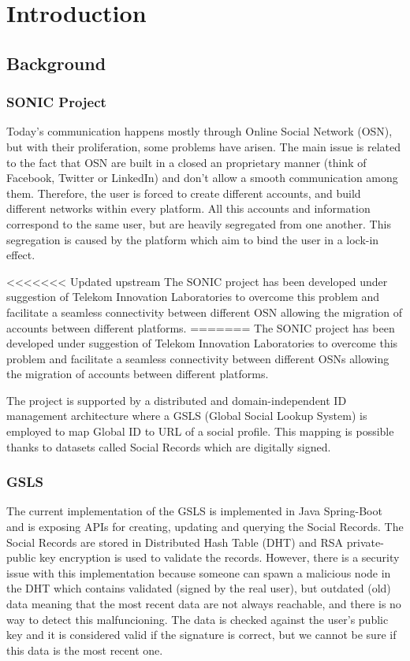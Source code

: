 \chapter{Introduction}
\label{introduction}

\section{Background}

\subsection{SONIC Project}
Today’s communication happens mostly through Online Social Network (OSN), but with their proliferation, some problems have arisen. The main issue is related to the fact that OSN are built in a closed an proprietary manner (think of Facebook, Twitter or LinkedIn) and don’t allow a smooth  communication among them. Therefore, the user is forced to create different accounts, and build different networks within every platform. All this accounts and information correspond to the same user, but are heavily segregated from one another. This segregation is caused by the platform which aim to bind the user in a lock-in effect.

<<<<<<< Updated upstream
The SONIC project has been developed under suggestion of Telekom Innovation Laboratories to overcome this problem and facilitate a seamless connectivity between different OSN \cite{gondor2014sonic} allowing the migration of accounts between different platforms.
=======
The SONIC project has been developed under suggestion of Telekom Innovation Laboratories to overcome this problem and facilitate a seamless connectivity between different OSNs \citep{gondor2014sonic} allowing the migration of accounts between different platforms.

The project is supported by a distributed and domain-independent ID management architecture where a GSLS (Global Social Lookup System) is employed to map Global ID to URL of a social profile. This mapping is possible thanks to datasets called Social Records which are digitally signed.

\subsection {GSLS}
The current implementation of the GSLS is implemented in Java Spring-Boot and is exposing APIs for creating, updating and  querying the Social Records. The Social Records are stored in  Distributed Hash Table (DHT) and RSA private-public key encryption is used to validate the records. However, there is a security issue with this implementation because someone can spawn a malicious node in the DHT which contains validated (signed by the real user), but outdated (old) data meaning that the most recent data are not always reachable, and there is no way to detect this malfuncioning. The data is checked against the user’s public key and it is considered valid if the signature is correct, but we cannot be sure if this data is the most recent one.

